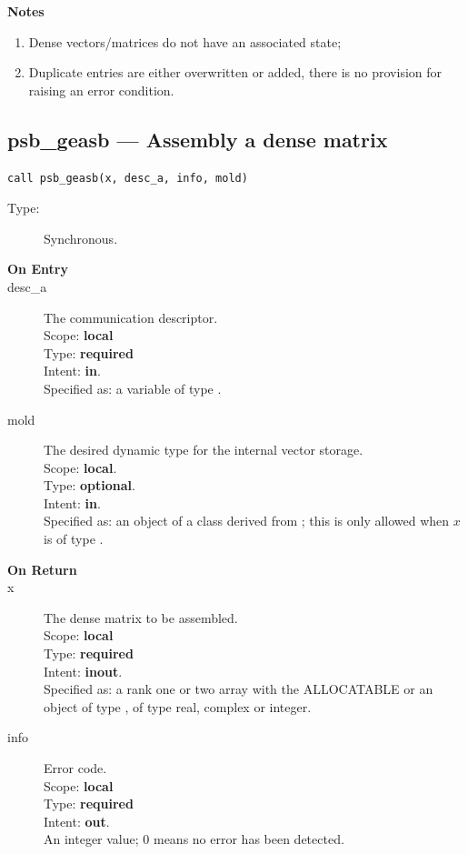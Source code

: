 {\par\noindent\large\bfseries Notes}
\begin{enumerate}
\item Dense vectors/matrices do not have an associated state;
\item Duplicate entries are either overwritten or added, there is no
  provision for raising an error condition. 
\end{enumerate}


%
%
\clearpage\subsection{psb\_geasb --- Assembly a dense matrix}

\begin{verbatim}
call psb_geasb(x, desc_a, info, mold)
\end{verbatim}

\begin{description}
\item[Type:] Synchronous.
\item[\bf On Entry]
\item[desc\_a] The communication descriptor.\\
Scope: {\bf local} \\
Type: {\bf required}\\
Intent: {\bf in}.\\
Specified as: a variable of type \descdata.\\
\item[mold] The desired dynamic type for the internal vector storage.\\
Scope: {\bf local}.\\
Type: {\bf optional}.\\
Intent: {\bf in}.\\
Specified as: an object of a class derived from \vbasedata; this is
only allowed when $x$ is of type \vdata.
\end{description}

\begin{description}
\item[\bf On Return]
\item[x] The dense matrix to be assembled.\\
Scope: {\bf local} \\
Type: {\bf required}\\
Intent: {\bf inout}.\\
Specified as: a rank one or two array with the ALLOCATABLE or an
object of type \vdata, of type real, complex or integer.\\
\item[info] Error code.\\
Scope: {\bf local} \\
Type: {\bf required} \\
Intent: {\bf out}.\\
An integer value; 0 means no error has been detected. 
\end{description}


